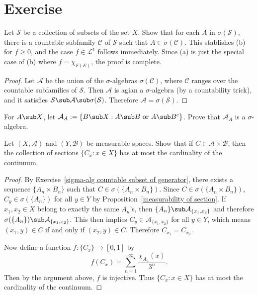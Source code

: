 \section{Exercise}
\begin{exercise}\label{sigma-alg countable subset of generator}
Let $\mathcal{S}$ be a collection of subsets of the set $X$. Show that for each $A$ in $\sigma(\mathcal{S})$, there is a countable subfamily $\mathcal{C}$ of $\mathcal{S}$ such that $A\in\sigma(\mathcal{C})$. This stablishes (b) for $f\geq 0$, and the case $f\in\mathcal{L}^1$ follows immediately. Since (a) is just the special case of (b) where $f=\chi_{F(E)}$, the proof is complete.
\end{exercise}
\begin{proof}
Let $\mathcal{A}$ be the union of the $\sigma$-algebras $\sigma(\mathcal{C})$, where $\mathcal{C}$ ranges over the countable subfamilies of $\mathcal{S}$. Then $\mathcal{A}$ is agian a $\sigma$-algebra (by a countability trick), and it satisfies $\mathcal{S}\sub\mathcal{A}\sub\sigma(\mathcal{S})$. Therefore $\mathcal{A}=\sigma(\mathcal{S})$.
\end{proof}
\begin{exercise}
For $A\sub X$, let $\mathcal{A}_A:=\{B\sub X:A\sub B\text{ or }A\sub B^c\}$. Prove that $\mathcal{A}_A$ is a $\sigma$-algebra.
\end{exercise}
\begin{exercise}\label{product measure section cardinality}
Let $(X,\mathcal{A})$ and $(Y,\mathcal{B})$ be measurable spaces. Show that if $C\in\mathcal{A}\times\mathcal{B}$, then the collection of sections $\{C_x:x\in X\}$ has at most the cardinality of the continuum.
\end{exercise}
\begin{proof}
By Exercise~\ref{sigma-alg countable subset of generator}, there exists a sequence $\{A_n\times B_n\}$ such that $C\in\sigma(\{A_n\times B_n\})$. Since $C\in\sigma(\{A_n\times B_n\})$, $C_y\in\sigma(\{A_n\})$ for all $y\in Y$ by Proposition~\ref{measurability of section}. If $x_1,x_2\in X$ belong to exactly the same $A_n$'s, then $\{A_n\}\sub\mathcal{A}_{\{x_1,x_2\}}$ and therefore $\sigma(\{A_n\})\sub\mathcal{A}_{\{x_1,x_2\}}$. This then implies $C_y\in\mathcal{A}_{\{x_1,x_2\}}$ for all $y\in Y$, which means $(x_1,y)\in C$ if and only if $(x_2,y)\in C$. Therefore $C_{x_1}=C_{x_2}$.\par
Now define a function $f:\{C_x\}\to[0,1]$ by
\[f(C_x)=\sum_{n=1}^{\infty}\frac{\chi_{A_n}(x)}{3^n}.\]
Then by the argument above, $f$ is injective. Thus $\{C_x:x\in X\}$ has at most the cardinality of the continuum.
\end{proof}
